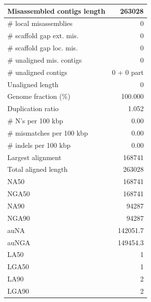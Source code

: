 \documentclass[12pt,a4paper]{article}
\begin{document}
\begin{table}[ht]
\begin{center}
\begin{tabular}{|l*{1}{|r}|}
Misassembled contigs length & 263028 \\ \hline
\# local misassemblies & 0 \\ \hline
\# scaffold gap ext. mis. & 0 \\ \hline
\# scaffold gap loc. mis. & 0 \\ \hline
\# unaligned mis. contigs & 0 \\ \hline
\# unaligned contigs & 0 + 0 part \\ \hline
Unaligned length & 0 \\ \hline
Genome fraction (\%) & 100.000 \\ \hline
Duplication ratio & 1.052 \\ \hline
\# N's per 100 kbp & 0.00 \\ \hline
\# mismatches per 100 kbp & 0.00 \\ \hline
\# indels per 100 kbp & 0.00 \\ \hline
Largest alignment & 168741 \\ \hline
Total aligned length & 263028 \\ \hline
NA50 & 168741 \\ \hline
NGA50 & 168741 \\ \hline
NA90 & 94287 \\ \hline
NGA90 & 94287 \\ \hline
auNA & 142051.7 \\ \hline
auNGA & 149454.3 \\ \hline
LA50 & 1 \\ \hline
LGA50 & 1 \\ \hline
LA90 & 2 \\ \hline
LGA90 & 2 \\ \hline
\end{tabular}
\end{center}
\end{table}
\end{document}
